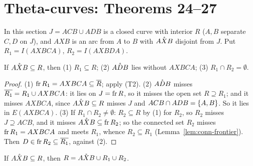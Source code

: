 
\section{Theta-curves: Theorems 24--27}

In this section $J=ACB\cup ADB$ is a closed curve with interior $R$ ($A,B$ separate $C,D$ on $J$), and
$AXB$ is an arc from $A$ to $B$ with $\mathring{AXB}$ disjoint from $J$. Put $R_1=I(AXBCA)$, $R_2=I(AXBDA)$.

\begin{theorem}[F.A.\ Theorem~24]\label{thm:fa24}
If $\mathring{AXB}\subseteq R$, then (1) $R_1\subseteq R$; (2) $\mathring{ADB}$ lies without $AXBCA$; (3)
$R_1\cap R_2=\emptyset$.
\end{theorem}

\begin{proof}
(1) $\operatorname{fr} R_1=AXBCA\subseteq\overline{R}$; apply (T2). (2) $\mathring{ADB}$ misses $\overline{R_1}=R_1\cup AXBCA$: it lies on $J=\operatorname{fr} R$, so it misses the open set $R\supseteq R_1$;
and it misses $AXBCA$, since $\mathring{AXB}\subseteq R$ misses $J$ and $ACB\cap ADB=\left\{ A,B \right\}$. So it lies in $E(AXBCA)$.
(3) If $R_1\cap R_2\ne\emptyset$: $R_2\subseteq R$ by (1) for $R_2$, so $R_2$ misses $J\supseteq ACB$,
and it misses $\mathring{AXB}\subseteq\operatorname{fr} R_2$; so the connected set $R_2$ misses $\operatorname{fr} R_1=AXBCA$ and meets $R_1$,
whence $R_2\subseteq R_1$ (Lemma~\ref{lem:conn-frontier}). Then $D\in\operatorname{fr} R_2\subseteq\overline{R_1}$, against (2).
\end{proof}


\begin{theorem}[F.A.\ Theorem~25]\label{thm:fa25}
If $\mathring{AXB}\subseteq R$, then $R=\mathring{AXB}\cup R_1\cup R_2$.
\end{theorem}

